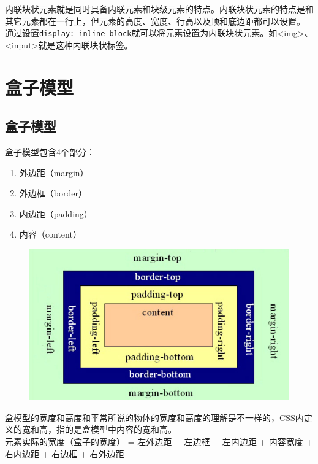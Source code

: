 内联块状元素就是同时具备内联元素和块级元素的特点。内联块状元素的特点是和其它元素都在一行上，但元素的高度、宽度、行高以及顶和底边距都可以设置。 \\

通过设置\lstinline|display: inline-block|就可以将元素设置为内联块状元素。如<img>、<input>就是这种内联块状标签。

\newpage

\section{盒子模型}

\subsection{盒子模型}

盒子模型包含4个部分：

\begin{enumerate}
	\item 外边距（margin）
	\item 外边框（border）
	\item 内边距（padding）
	\item 内容（content）
\end{enumerate}

\begin{figure}[H]
	\centering
	\includegraphics[scale=0.7]{img/C8/8-2/1.png}
\end{figure}

盒模型的宽度和高度和平常所说的物体的宽度和高度的理解是不一样的，CSS内定义的宽和高，指的是盒模型中内容的宽和高。 \\

元素实际的宽度（盒子的宽度） = 左外边距 + 左边框 + 左内边距 + 内容宽度 + 右内边距 + 右边框 + 右外边距 \\

